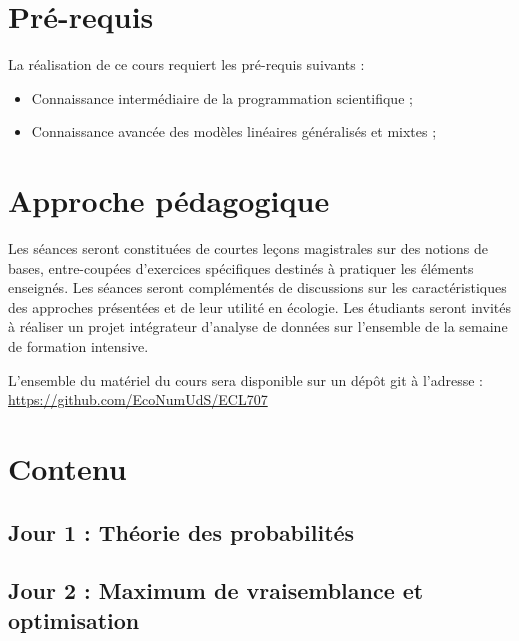 \documentclass[12]{article}
\begin{document}
	\section*{Pré-requis}

	La réalisation de ce cours requiert les pré-requis suivants :

  \begin{itemize}
    \renewcommand{\labelitemi}{$\bullet$}
	   \item Connaissance intermédiaire de la programmation scientifique ;

     \item Connaissance avancée des modèles linéaires généralisés et mixtes ;
  \end{itemize}


  \section*{Approche pédagogique}

  Les séances seront constituées de courtes leçons magistrales sur des notions
  de bases, entre-coupées d'exercices spécifiques destinés à pratiquer les
  éléments enseignés. Les séances seront complémentés de discussions sur les
  caractéristiques des approches présentées et de leur utilité en écologie. Les
  étudiants seront invités à réaliser un projet intégrateur d'analyse de données
  sur l'ensemble de la semaine de formation intensive.

	L'ensemble du matériel du cours sera disponible sur un dépôt git à l'adresse :\\
	\url{https://github.com/EcoNumUdS/ECL707}

	\section*{Contenu}

	\subsection*{Jour 1 : Théorie des probabilités}


  \subsection*{Jour 2 : Maximum de vraisemblance et optimisation}
\end{document}
